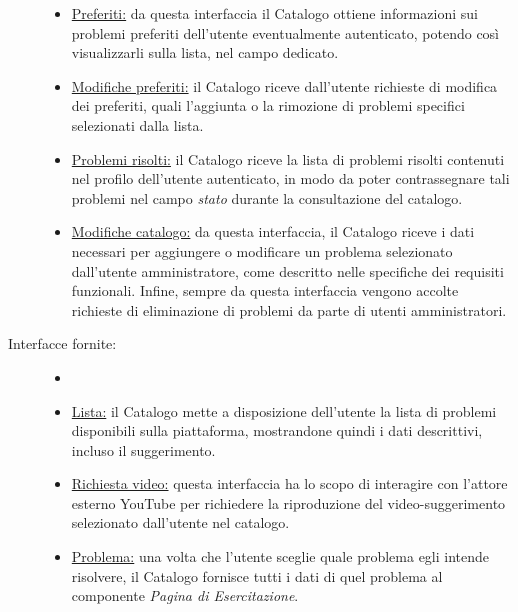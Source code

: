 \documentclass[11pt, a4paper]{article}
\theoremstyle{definition} %
\begin{document}
\begin{description}
\begin{itemize}
        \item \underline{Preferiti:} da questa interfaccia il Catalogo
        ottiene informazioni sui problemi preferiti dell'utente
        eventualmente autenticato, potendo così visualizzarli sulla
        lista, nel campo dedicato.

        \item \underline{Modifiche preferiti:} il Catalogo riceve
        dall'utente richieste di modifica dei preferiti, quali
        l'aggiunta o la rimozione di problemi specifici selezionati
        dalla lista.

        \item \underline{Problemi risolti:} il Catalogo riceve la
        lista di problemi risolti contenuti nel profilo dell'utente
        autenticato, in modo da poter contrassegnare tali problemi
        nel campo \textit{stato} durante la consultazione del
        catalogo.

        \item \underline{Modifiche catalogo:} da questa interfaccia,
        il Catalogo riceve i dati necessari per aggiungere o modificare
        un problema selezionato dall'utente amministratore, come
        descritto nelle specifiche dei requisiti funzionali. Infine,
        sempre da questa interfaccia vengono accolte richieste di
        eliminazione di problemi da parte di utenti amministratori.
    \end{itemize}

    \item[Interfacce fornite:]
    \begin{itemize}
        \item[]

        \item \underline{Lista:} il Catalogo mette a disposizione
        dell'utente la lista di problemi disponibili sulla piattaforma,
        mostrandone quindi i dati descrittivi, incluso il suggerimento.

        \item \underline{Richiesta video:} questa interfaccia ha lo scopo
        di interagire con l'attore esterno YouTube per richiedere la
        riproduzione del video-suggerimento selezionato dall'utente
        nel catalogo.

        \item \underline{Problema:} una volta che l'utente sceglie quale
        problema egli intende risolvere, il Catalogo fornisce tutti i
        dati di quel problema al componente \textit{Pagina di Esercitazione}.


\end{itemize}
\end{description}
\end{document}
